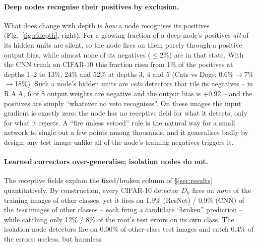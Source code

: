 \paragraph{Deep nodes recognise their positives by exclusion.} What does change with depth is
\emph{how} a node recognises its positives (Fig.~\ref{fig:rfdepth}, right). For a growing fraction of
a deep node's positives \emph{all} of its hidden units are silent, so the node fires on them purely
through a positive output bias, while almost none of its negatives ($\le$2\%) are in that state. With
the CNN trunk on CIFAR-10 this fraction rises from 1\% of the positives at depths 1--2 to 13\%, 24\% and
52\% at depths 3, 4 and 5 (Cats vs Dogs: 0.6\%$\to$7\%$\to$18\%). Such a node's hidden units are
\emph{veto} detectors that tile its negatives -- in R.A.A, 6 of 8 output weights are negative and the
output bias is $+0.92$ -- and the positives are simply ``whatever no veto recognises''. On these images
the input gradient is exactly zero: the node has no receptive field for what it detects, only for what
it rejects. A ``fire unless vetoed'' rule is the natural way for a small network to single out a few
points among thousands, and it generalises badly by design: any test image unlike all of the node's
training negatives triggers it.

\paragraph{Learned correctors over-generalise; isolation nodes do not.} The receptive fields explain
the fixed/broken column of \S\ref{sec:results} quantitatively. By construction, every CIFAR-10 detector
$D_k$ fires on \emph{none} of the training images of other classes, yet it fires on 1.9\% (ResNet) /
0.9\% (CNN) of the \emph{test} images of other classes -- each firing a candidate ``broken''
prediction -- while catching only 12\% / 8\% of the root's test errors on its own class. The
isolation-node detectors fire on 0.00\% of other-class test images and catch 0.4\% of the errors:
useless, but harmless.
